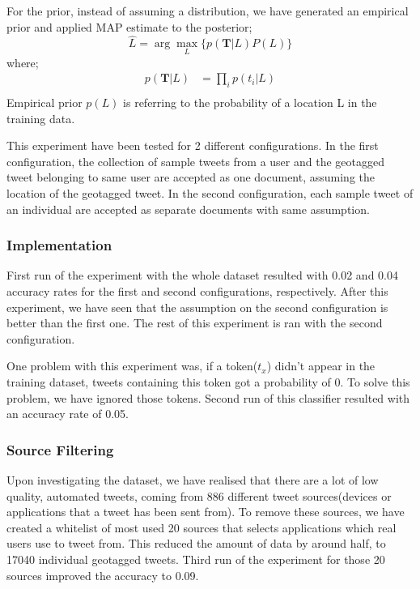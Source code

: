 \documentclass[twoside,11pt]{article}
\begin{document}
For the prior, instead of assuming a distribution, we have generated an empirical prior and applied MAP estimate to the posterior;
\begin{equation*}
\hat{L} = \arg\max_L\{p(\mathbf{T} | L) P(L)\}
\end{equation*}
where;
\begin{equation*}
\begin{split}
p(\mathbf{T} | L) &= \prod_i{p(t_i|L)}\\
\end{split}
\end{equation*}
Empirical prior $p(L)$ is referring to the probability of a location L in the training data.

This experiment have been tested for 2 different configurations. In the first configuration, the collection of sample tweets from a user and the geotagged tweet belonging to same user are accepted as one document, assuming the location of the geotagged tweet. In the second configuration, each sample tweet of an individual are accepted as separate documents with same assumption. 

\subsubsection{Implementation}
First run of the experiment with the whole dataset resulted with 0.02 and 0.04 accuracy rates for the first and second configurations, respectively. After this experiment, we have seen that the assumption on the second configuration is better than the first one. The rest of this experiment is ran with the second configuration.

One problem with this experiment was, if a token($t_x$) didn't appear in the training dataset, tweets containing this token got a probability of 0. To solve this problem, we have ignored those tokens. Second run of this classifier resulted with an accuracy rate of 0.05.

\subsubsection{Source Filtering}
Upon investigating the dataset, we have realised that there are a lot of low quality, automated tweets, coming from 886 different tweet sources(devices or applications that a tweet has been sent from). To remove these sources, we have created a whitelist of most used 20 sources that selects applications which real users use to tweet from. This reduced the amount of data by around half, to 17040 individual geotagged tweets. Third run of the experiment for those 20 sources improved the accuracy to 0.09. 
\end{document}
